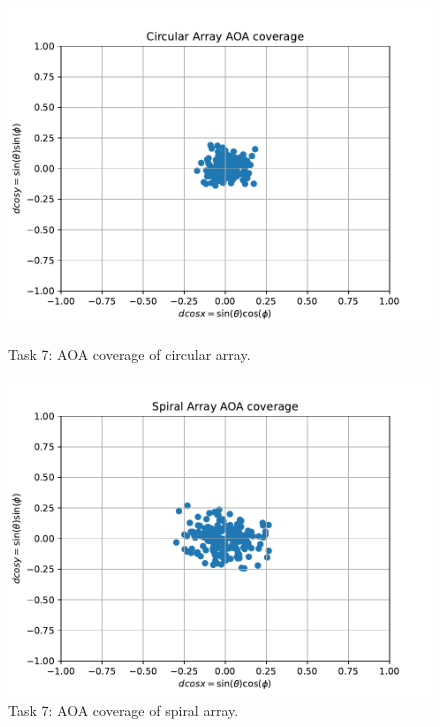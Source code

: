 \begin{figure}
    \centering
    \begin{minipage}{0.48\textwidth}
        \centering
        \includegraphics[width=1.0\textwidth]{graphics/t7/t7-aoa-circ.pdf} %
        \caption{Task 7: AOA coverage of circular array.}
        \label{fig:t7-aoa-circ}
    \end{minipage}\hfill
    \begin{minipage}{0.48\textwidth}
        \centering
        \includegraphics[width=1\textwidth]{graphics/t7/t7-aoa-spir.pdf} %
        \caption{Task 7: AOA coverage of spiral array.}
        \label{fig:t7-aoa-spir}
    \end{minipage}
\end{figure}
